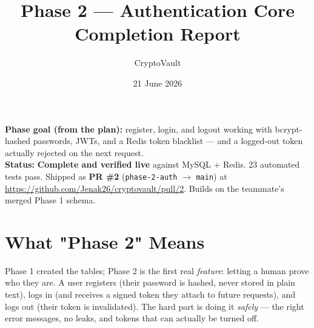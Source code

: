 \documentclass[11pt,a4paper]{article}
\title{\vspace{-1cm}\textbf{Phase 2 — Authentication Core}\\[3pt]
\large Completion Report}
\author{CryptoVault}
\date{21 June 2026}
\newcommand{\code}[1]{\texttt{#1}}
\begin{document}
\maketitle
\thispagestyle{fancy}

\begin{note}
\textbf{Phase goal (from the plan):} register, login, and logout working with bcrypt-hashed
passwords, JWTs, and a Redis token blacklist --- and a logged-out token actually rejected on the
next request.\\[4pt]
\textbf{Status:} \textbf{Complete and verified live} against MySQL + Redis. 23 automated tests pass.
Shipped as \textbf{PR \#2} (\code{phase-2-auth} $\rightarrow$ \code{main}) at
\url{https://github.com/Jenak26/cryptovault/pull/2}. Builds on the teammate's merged Phase 1 schema.
\end{note}

\section{What "Phase 2" Means}
Phase 1 created the tables; Phase 2 is the first real \emph{feature}: letting a human prove who they
are. A user registers (their password is hashed, never stored in plain text), logs in (and receives
a signed token they attach to future requests), and logs out (their token is invalidated). The hard
part is doing it \emph{safely} --- the right error messages, no leaks, and tokens that can actually
be turned off.

\end{document}
